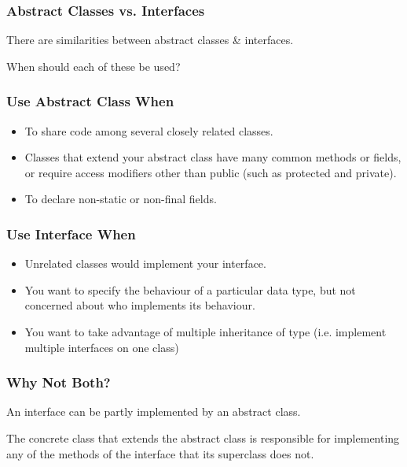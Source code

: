 \begin{frame}
\frametitle{Abstract Classes vs. Interfaces}
\begin{changemargin}{1cm}

There are similarities between abstract classes \& interfaces.

When should each of these be used?

\end{changemargin}
\end{frame}

\begin{frame}
\frametitle{Use Abstract Class When}
\begin{changemargin}{1cm}

\begin{itemize}
\item To share code among several closely related classes.
\item Classes that extend your abstract class have many common methods or fields, or require access modifiers other than public (such as protected and private).
\item To declare non-static or non-final fields. 
\end{itemize}

\end{changemargin}
\end{frame}

\begin{frame}
\frametitle{Use Interface When}
\begin{changemargin}{1cm}

\begin{itemize}
\item Unrelated classes would implement your interface. 
\item You want to specify the behaviour of a particular data type, but not concerned about who implements its behaviour.
\item You want to take advantage of multiple inheritance of type (i.e. implement multiple interfaces on one class)
\end{itemize}

\end{changemargin}
\end{frame}

\begin{frame}
\frametitle{Why Not Both?}
\begin{changemargin}{1cm}

An interface can be partly implemented by an abstract class. 

The concrete class that extends the abstract class is responsible for implementing any of the methods of the interface that its superclass does not. 
\end{changemargin}
\end{frame}

